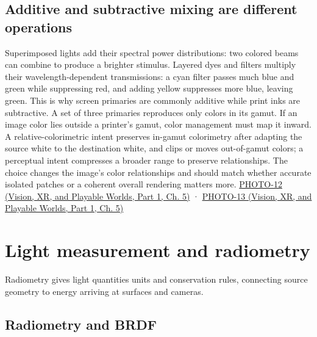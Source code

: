 \subsection{Additive and subtractive mixing are different operations}\label{03-visual-computing-i-ch004-additive-and-subtractive-mixing-are-different-operations}

\hypertarget{03-visual-computing-i-ch004-additive-and-subtractive-mixing-are-different-operations}{}

Superimposed lights add their spectral power distributions: two colored beams can combine to produce a brighter stimulus. Layered dyes and filters multiply their wavelength-dependent transmissions: a cyan filter passes much blue and green while suppressing red, and adding yellow suppresses more blue, leaving green. This is why screen primaries are commonly additive while print inks are subtractive. A set of three primaries reproduces only colors in its gamut. If an image color lies outside a printer's gamut, color management must map it inward. A relative-colorimetric intent preserves in-gamut colorimetry after adapting the source white to the destination white, and clips or moves out-of-gamut colors; a perceptual intent compresses a broader range to preserve relationships. The choice changes the image's color relationships and should match whether accurate isolated patches or a coherent overall rendering matters more. \href{../07-Vision-XR-and-Playable-Worlds-P01/main.pdf\#nameddest=04-visual-computing-ii-ch036-photo-12---photography-session-12}{PHOTO-12 (Vision, XR, and Playable Worlds, Part 1, Ch. 5)} · \href{../07-Vision-XR-and-Playable-Worlds-P01/main.pdf\#nameddest=04-visual-computing-ii-ch036-photo-13---photography-session-13}{PHOTO-13 (Vision, XR, and Playable Worlds, Part 1, Ch. 5)}

\section{Light measurement and radiometry}\label{03-visual-computing-i-ch004-light-measurement-and-radiometry}

\hypertarget{03-visual-computing-i-ch004-light-measurement-and-radiometry}{}

Radiometry gives light quantities units and conservation rules, connecting source geometry to energy arriving at surfaces and cameras.

\subsection{Radiometry and BRDF}\label{03-visual-computing-i-ch004-radiometry-and-brdf}

